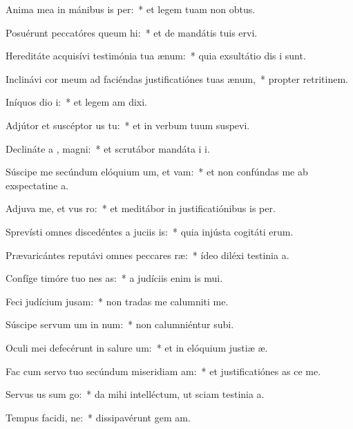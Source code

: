 \item Anima mea in mánibus is per:~* et legem tuam non  obtus.
\item Posuérunt peccatóres queum hi:~* et de mandátis tuis  ervi.
\item Hereditáte acquisívi testimónia tua  ænum:~* quia exsultátio dis i sunt.
\item Inclinávi cor meum ad faciéndas justificatiónes tuas  ænum,~* propter retritinem.
\item Iníquos dio i:~* et legem am dixi.
\item Adjútor et suscéptor us  tu:~* et in verbum tuum suspevi.
\item Declináte a , magni:~* et scrutábor mandáta i i.
\item Súscipe me secúndum elóquium um, et vam:~* et non confúndas me ab exspectatine a.
\item Adjuva me, et vus ro:~* et meditábor in justificatiónibus is per.
\item Sprevísti omnes discedéntes a juciis is:~* quia injústa cogitáti erum.
\item Prævaricántes reputávi omnes peccares ræ:~* ídeo diléxi testinia a.
\item Confíge timóre tuo nes as:~* a judíciis enim is mui.
\item Feci judícium  jusam:~* non tradas me calumniti me.
\item Súscipe servum um in num:~* non calumniéntur  subi.
\item Oculi mei defecérunt in salure um:~* et in elóquium justiæ æ.
\item Fac cum servo tuo secúndum miseridiam am:~* et justificatiónes as ce me.
\item Servus us sum go:~* da mihi intelléctum, ut sciam testinia a.
\item Tempus facidi, ne:~* dissipavérunt gem am.

